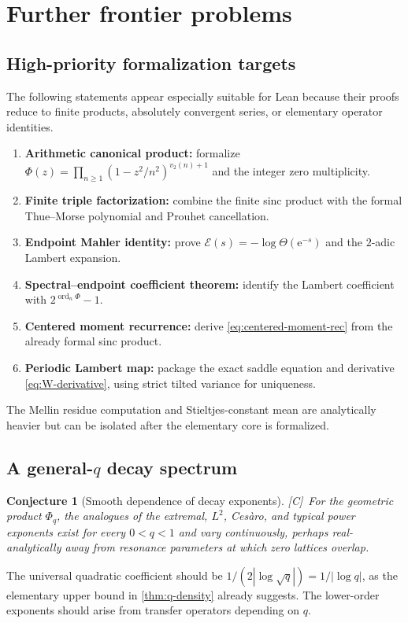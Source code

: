 \documentclass[11pt,oneside]{article}
\newtheorem{conjecture}[theorem]{Conjecture}
\theoremstyle{definition}
\theoremstyle{remark}
\newcommand{\e}{\mathrm e}
\newcommand{\ord}{\operatorname{ord}}
\newcommand{\vtwo}{v_2}
\newcommand{\statusC}{\textsf{[C]}}
\begin{document}
\section{Further frontier problems}
\label{sec:frontiers}

\subsection{High-priority formalization targets}
The following statements appear especially suitable for Lean because their proofs reduce to
finite products, absolutely convergent series, or elementary operator identities.
\begin{enumerate}
\item \textbf{Arithmetic canonical product:} formalize
$\Phi(z)=\prod_{n\ge1}(1-z^2/n^2)^{\vtwo(n)+1}$ and the integer zero multiplicity.
\item \textbf{Finite triple factorization:} combine the finite sinc product with the
formal Thue--Morse polynomial and Prouhet cancellation.
\item \textbf{Endpoint Mahler identity:} prove
$\mathcal E(s)=-\log\Theta(\e^{-s})$ and the $2$-adic Lambert expansion.
\item \textbf{Spectral--endpoint coefficient theorem:} identify the Lambert coefficient
with $2^{\ord_n\Phi}-1$.
\item \textbf{Centered moment recurrence:} derive
\eqref{eq:centered-moment-rec} from the already formal sinc product.
\item \textbf{Periodic Lambert map:} package the exact saddle equation and derivative
\eqref{eq:W-derivative}, using strict tilted variance for uniqueness.
\end{enumerate}
The Mellin residue computation and Stieltjes-constant mean are analytically heavier but can
be isolated after the elementary core is formalized.

\subsection{A general-$q$ decay spectrum}
\begin{conjecture}[Smooth dependence of decay exponents]\label{conj:q-spectrum}
\statusC\ For the geometric product $\Phi_q$, the analogues of the extremal, $L^2$,
Ces\`aro, and typical power exponents exist for every $0<q<1$ and vary continuously, perhaps
real-analytically away from resonance parameters at which zero lattices overlap.
\end{conjecture}
The universal quadratic coefficient should be
$1/(2|\log\sqrt q|)=1/|\log q|$, as the elementary upper bound in
\cref{thm:q-density} already suggests.  The lower-order exponents should arise from transfer
operators depending on $q$.
\end{document}
